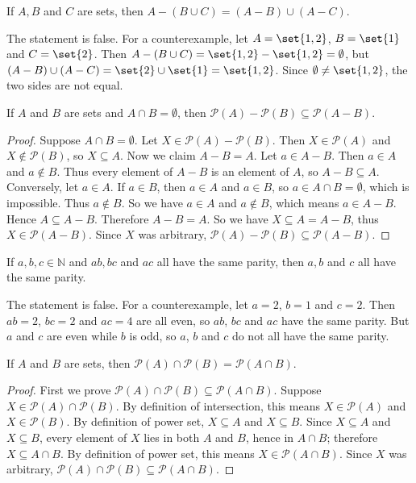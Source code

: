 \documentclass[DIN, pagenumber=false, fontsize=11pt, parskip=half]{scrartcl}
\begin{document}
\begin{problems}
    \problem If $A,B$ and $C$ are sets, then $A - (B \cup C) = (A - B) \cup (A - C)$.
    \begin{disproof}
        The statement is false.
        For a counterexample, let $A = \set{1,2}$, $B = \set{1}$ and $C = \set{2}$.
        Then $A - (B \cup C) = \set{1,2} - \set{1,2} = \emptyset$,
        but $(A - B) \cup (A - C) = \set{2} \cup \set{1} = \set{1,2}$.
        Since $\emptyset \ne \set{1,2}$, the two sides are not equal.
    \end{disproof}

    \problem If $A$ and $B$ are sets and $A \cap B = \emptyset$, then $\mathcal{P}(A) -\mathcal{P}(B) \subseteq \mathcal{P}(A - B)$.
    \begin{proof}
        Suppose $A \cap B = \emptyset$.
        Let $X \in \mathcal{P}(A) - \mathcal{P}(B)$.
        Then $X \in \mathcal{P}(A)$ and $X \notin \mathcal{P}(B)$, so $X \subseteq A$.
        Now we claim $A - B = A$. 
        Let $a \in A - B$.
        Then $a \in A$ and $a \notin B$.
        Thus every element of $A - B$ is an element of $A$, so $A - B \subseteq A$.
        Conversely, let $a \in A$.
        If $a \in B$, then $a \in A$ and $a \in B$, so $a \in A \cap B = \emptyset$, which is impossible.
        Thus $a \notin B$.
        So we have $a \in A$ and $a \notin B$, which means $a \in A - B$.
        Hence $A \subseteq A - B$.
        Therefore $A - B = A$.
        So we have $X \subseteq A = A - B$, thus $X \in \mathcal{P}(A-B)$.
        Since $X$ was arbitrary, $\mathcal{P}(A) - \mathcal{P}(B) \subseteq \mathcal{P}(A-B)$.
    \end{proof}

    \problem If $a,b,c \in \mathbb{N}$ and $ab, bc$ and $ac$ all have the same parity, then $a,b$ and $c$ all have the same parity.
    \begin{disproof}
        The statement is false.
        For a counterexample, let $a = 2$, $b = 1$ and $c = 2$.
        Then $ab = 2$, $bc = 2$ and $ac = 4$ are all even, so $ab$, $bc$ and $ac$ have the same parity.
        But $a$ and $c$ are even while $b$ is odd, so $a$, $b$ and $c$ do not all have the same parity.
    \end{disproof}

    \problem If $A$ and $B$ are sets, then $\mathcal{P}(A) \cap \mathcal{P}(B) = \mathcal{P}(A \cap B)$.
    \begin{proof}
        First we prove $\mathcal{P}(A) \cap \mathcal{P}(B) \subseteq \mathcal{P}(A \cap B)$.
        Suppose $X \in \mathcal{P}(A) \cap \mathcal{P}(B)$.
        By definition of intersection, this means $X \in \mathcal{P}(A)$ and $X \in \mathcal{P}(B)$.
        By definition of power set, $X \subseteq A$ and $X \subseteq B$.
        Since $X \subseteq A$ and $X \subseteq B$, every element of $X$ lies in both $A$ and $B$, hence in $A \cap B$; therefore $X \subseteq A \cap B$.
        By definition of power set, this means $X \in \mathcal{P}(A \cap B)$.
        Since $X$ was arbitrary, $\mathcal{P}(A) \cap \mathcal{P}(B) \subseteq \mathcal{P}(A \cap B)$.


\end{proof}
\end{problems}
\end{document}
